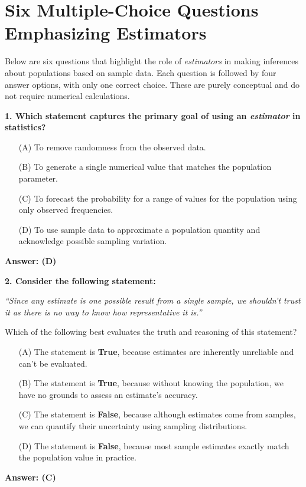 \documentclass[12pt]{article}
\begin{document}
\section*{Six Multiple-Choice Questions Emphasizing Estimators}

Below are six questions that highlight the role of \emph{estimators} in making inferences about populations based on sample data. Each question is followed by four answer options, with only one correct choice. These are purely conceptual and do not require numerical calculations.

\bigskip

\textbf{1. Which statement captures the primary goal of using an \emph{estimator} in statistics?}
\begin{enumerate}
\item[(A)] To remove randomness from the observed data.
\item[(B)] To generate a single numerical value that matches the population parameter.
\item[(C)] To forecast the probability for a range of values for the population using only observed frequencies.
\item[(D)] To use sample data to approximate a population quantity and acknowledge possible sampling variation.
\end{enumerate}
\textbf{Answer: (D)}

\bigskip

\textbf{2. Consider the following statement:}

\emph{“Since any estimate is one possible result from a single sample, we shouldn’t trust it as there is no way to know how representative it is.”}

Which of the following best evaluates the truth and reasoning of this statement?

\begin{enumerate}
\item[(A)] The statement is \textbf{True}, because estimates are inherently unreliable and can’t be evaluated.
\item[(B)] The statement is \textbf{True}, because without knowing the population, we have no grounds to assess an estimate’s accuracy.
\item[(C)] The statement is \textbf{False}, because although estimates come from samples, we can quantify their uncertainty using sampling distributions.
\item[(D)] The statement is \textbf{False}, because most sample estimates exactly match the population value in practice.
\end{enumerate}
\textbf{Answer: (C)}
\end{document}
